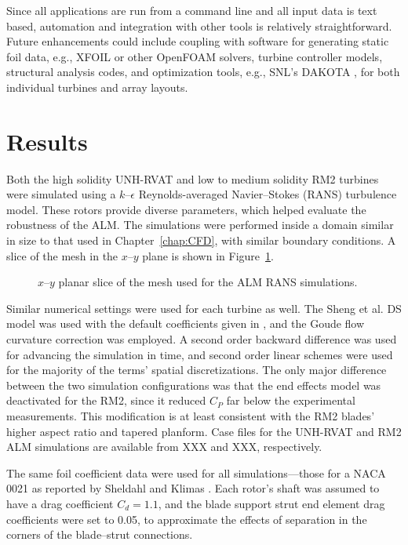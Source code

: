 Since all applications are run from a command line and all input data is text
based, automation and integration with other tools is relatively
straightforward. Future enhancements could include coupling with software for
generating static foil data, e.g., XFOIL or other OpenFOAM solvers, turbine
controller models, structural analysis codes, and optimization tools, e.g.,
SNL's DAKOTA , for both individual
turbines and array layouts.


\section{Results}

Both the high solidity UNH-RVAT and low to medium solidity RM2 turbines were
simulated using a $k$--$\epsilon$ Reynolds-averaged Navier--Stokes (RANS)
turbulence model. These rotors provide diverse parameters, which helped evaluate
the robustness of the ALM. The simulations were performed inside a domain
similar in size to that used in Chapter~\ref{chap:CFD}, with similar boundary
conditions. A slice of the mesh in the $x$--$y$ plane is shown in
Figure~\ref{fig:ALM-mesh}.

\begin{figure}
    
    \caption{$x$--$y$ planar slice of the mesh used for the ALM RANS
        simulations.}
    
    \label{fig:ALM-mesh}
\end{figure}

Similar numerical settings were used for each turbine as well. The Sheng et al.
DS model was used with the default coefficients given in \cite{Sheng2008}, and
the Goude flow curvature correction was employed. A second order backward
difference was used for advancing the simulation in time, and second order
linear schemes were used for the majority of the terms' spatial discretizations.
The only major difference between the two simulation configurations was that the
end effects model was deactivated for the RM2, since it reduced $C_P$ far below
the experimental measurements. This modification is at least consistent with the
RM2 blades' higher aspect ratio and tapered planform. Case files for the
UNH-RVAT and RM2 ALM simulations are available from XXX and XXX, respectively.

The same foil coefficient data were used for all simulations---those for a NACA
0021 as reported by Sheldahl and Klimas \cite{Sheldahl1981}. Each rotor's shaft
was assumed to have a drag coefficient $C_d = 1.1$, and the blade support strut
end element drag coefficients were set to 0.05, to approximate the effects of
separation in the corners of the blade--strut connections.

